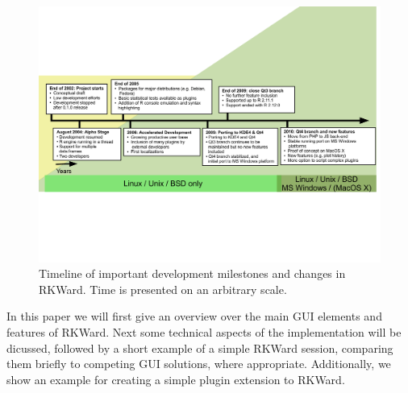 \begin{figure}[htp]
 \centering
 \includegraphics[clip=true,trim=0cm 5.7cm 0cm 5.7cm,width=16cm]{../figures/timeline.pdf}
 \caption{Timeline of important development milestones and changes in RKWard.
          Time is presented on an arbitrary scale.}
 \label{fig:timeline}
\end{figure}


In this paper we will first give an overview over the main GUI elements and
features of RKWard. Next some technical aspects of the implementation will be
dicussed, followed by a short example of a simple RKWard session, comparing 
them briefly to competing GUI solutions, where appropriate. Additionally,
we show an example for creating a simple plugin extension to RKWard.
